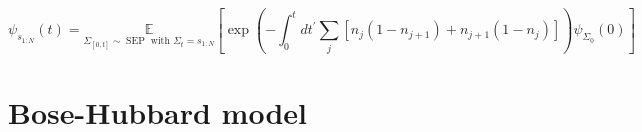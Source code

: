 \begin{equation}
	\psi_{s_{1: N}}(t)=\underset{\Sigma_{[0, t]} \sim \operatorname{SEP} \text{ with } \Sigma_{t}=s_{1: N}}{\mathbb{E}}
	\left[\exp \left(-\int_{0}^{t} d t^{\prime} \sum_{j}\left[n_{j}\left(1-n_{j+1}\right)+n_{j+1}\left(1-n_{j}\right)\right]\right) \psi_{\Sigma_{0}}(0)\right]
\end{equation}

\section{Bose-Hubbard model}
\label{sec:res-bhm}




